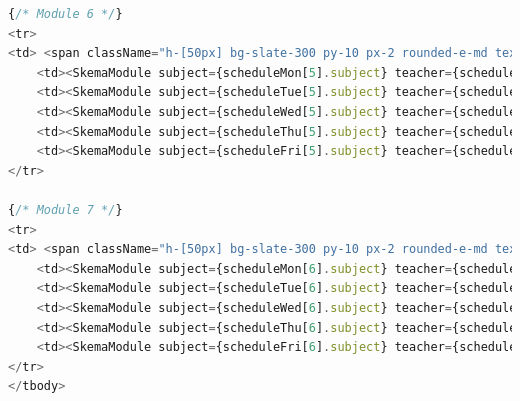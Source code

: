 \documentclass[12pt, a4paper]{article}
\begin{document}
\begin{appendices}
\begin{lstlisting}[language=Javascript]
{/* Module 6 */}
<tr>
<td> <span className="h-[50px] bg-slate-300 py-10 px-2 rounded-e-md text-slate-600 font-bold">6.</span> </td>
    <td><SkemaModule subject={scheduleMon[5].subject} teacher={scheduleMon[5].teacher} room={scheduleMon[5].room} visibility={scheduleMon[5].visibility} note={scheduleMon[5].note} homework={scheduleMon[5].homework} id={scheduleMon[5].id} /></td>
    <td><SkemaModule subject={scheduleTue[5].subject} teacher={scheduleTue[5].teacher} room={scheduleTue[5].room} visibility={scheduleTue[5].visibility} note={scheduleTue[5].note} homework={scheduleTue[5].homework} id={scheduleTue[5].id} /></td>
    <td><SkemaModule subject={scheduleWed[5].subject} teacher={scheduleWed[5].teacher} room={scheduleWed[5].room} visibility={scheduleWed[5].visibility} note={scheduleWed[5].note} homework={scheduleWed[5].homework} id={scheduleWed[5].id} /></td>
    <td><SkemaModule subject={scheduleThu[5].subject} teacher={scheduleThu[5].teacher} room={scheduleThu[5].room} visibility={scheduleThu[5].visibility} note={scheduleThu[5].note} homework={scheduleThu[5].homework} id={scheduleThu[5].id} /></td>
    <td><SkemaModule subject={scheduleFri[5].subject} teacher={scheduleFri[5].teacher} room={scheduleFri[5].room} visibility={scheduleFri[5].visibility} note={scheduleFri[5].note} homework={scheduleFri[5].homework} id={scheduleFri[5].id} /></td>
</tr>

{/* Module 7 */}
<tr>
<td> <span className="h-[50px] bg-slate-300 py-10 px-2 rounded-e-md text-slate-600 font-bold">7.</span> </td>
    <td><SkemaModule subject={scheduleMon[6].subject} teacher={scheduleMon[6].teacher} room={scheduleMon[6].room} visibility={scheduleMon[6].visibility} note={scheduleMon[6].note} homework={scheduleMon[6].homework} id={scheduleMon[6].id} /></td>
    <td><SkemaModule subject={scheduleTue[6].subject} teacher={scheduleTue[6].teacher} room={scheduleTue[6].room} visibility={scheduleTue[6].visibility} note={scheduleTue[6].note} homework={scheduleTue[6].homework} id={scheduleTue[6].id} /></td>
    <td><SkemaModule subject={scheduleWed[6].subject} teacher={scheduleWed[6].teacher} room={scheduleWed[6].room} visibility={scheduleWed[6].visibility} note={scheduleWed[6].note} homework={scheduleWed[6].homework} id={scheduleWed[6].id} /></td>
    <td><SkemaModule subject={scheduleThu[6].subject} teacher={scheduleThu[6].teacher} room={scheduleThu[6].room} visibility={scheduleThu[6].visibility} note={scheduleThu[6].note} homework={scheduleThu[6].homework} id={scheduleThu[6].id} /></td>
    <td><SkemaModule subject={scheduleFri[6].subject} teacher={scheduleFri[6].teacher} room={scheduleFri[6].room} visibility={scheduleFri[6].visibility} note={scheduleFri[6].note} homework={scheduleFri[6].homework} id={scheduleFri[6].id} /></td>
</tr>
</tbody>
        \end{lstlisting} \newpage

\end{appendices}
\end{document}
